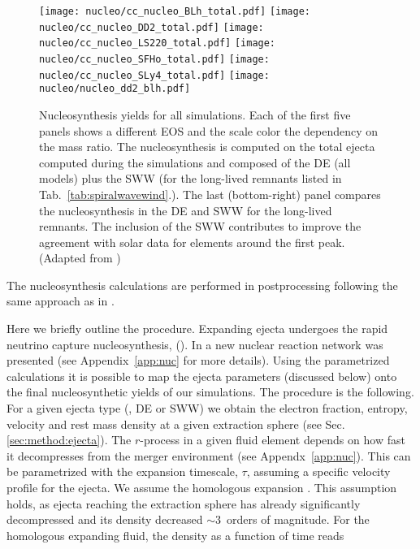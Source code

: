 \begin{figure*}[t]
    \centering 
    \texttt{[image: nucleo/cc\_nucleo\_BLh\_total.pdf]}
    \texttt{[image: nucleo/cc\_nucleo\_DD2\_total.pdf]}
    \texttt{[image: nucleo/cc\_nucleo\_LS220\_total.pdf]}
    \texttt{[image: nucleo/cc\_nucleo\_SFHo\_total.pdf]}
    \texttt{[image: nucleo/cc\_nucleo\_SLy4\_total.pdf]}
    \texttt{[image: nucleo/nucleo\_dd2\_blh.pdf]}
    \caption{Nucleosynthesis yields for all simulations. Each %
        of the first five panels 
        shows a different EOS and the scale color the dependency on the
        mass ratio. The nucleosynthesis is computed on the total ejecta
        computed during the simulations and 
        composed of the \ac{DE} (all models) plus the \ac{SWW} 
        (for the long-lived remnants listed in
        Tab.~\ref{tab:spiralwavewind}.).
        The last (bottom-right) panel compares the nucleosynthesis in
        the \ac{DE} and \ac{SWW} for the long-lived
        remnants. The inclusion of the \ac{SWW} contributes to 
        improve the agreement with solar data for elements around the first peak.
        (Adapted from \citet{Nedora:2020pak})
    }
    \label{fig:nucle:totalyields}
\end{figure*}

The nucleosynthesis calculations are performed in postprocessing
following the same approach as in \cite{Radice:2016dwd,Radice:2018pdn}.

Here we briefly outline the procedure. 
Expanding ejecta undergoes the rapid neutrino capture nucleosynthesis, (\rproc{}).
In \citet{Lippuner:2015gwa} a new nuclear reaction network was presented 
(see Appendix~\ref{app:nuc} for more details). 
Using the parametrized \rproc{} calculations it is possible to map the ejecta 
parameters (discussed below) onto the final nucleosynthetic yields of our simulations.
The procedure is the following. 
For a given ejecta type (\eg, \ac{DE} or \ac{SWW}) we obtain the electron fraction,
entropy, velocity and rest mass density at a given extraction sphere 
(see Sec.\ref{sec:method:ejecta}).
The $r$-process in a given fluid element depends on how fast it decompresses from the 
merger environment (see Appendx~\ref{app:nuc}). 
This can be parametrized with the expansion timescale, $\tau$, assuming a specific 
velocity profile for the ejecta. We assume the homologous expansion .
This assumption holds, as ejecta reaching the extraction sphere has already 
significantly decompressed and its density decreased ${\sim}3$~orders of magnitude. 
For the homologous expanding fluid, the density as a function of time reads 

